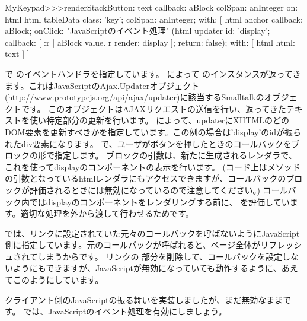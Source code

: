 \documentclass[a4paper,10pt,twoside]{book}
\begin{document}
\begin{code}{}
MyKeypad>>>renderStackButton: text callback: aBlock colSpan: anInteger on: html 
	html tableData
		class: 'key';
		colSpan: anInteger;
		with: [
			html anchor
				callback: aBlock;
				onClick:				"JavaScriptのイベント処理"
					(html updater
						id: 'display';
						callback: [ :r |
							aBlock value.
							r render: display ];
						return: false);
				with: [ html html: text ] ]
\end{code}

で のイベントハンドラを指定しています。
 によって のインスタンスが返ってきます。これはJavaScriptのAjax.Updaterオブジェクト(\url{http://www.prototypejs.org/api/ajax/updater})に該当するSmalltalkのオブジェクトです。
このオブジェクトはAJAXリクエストの送信を行い、返ってきたテキストを使い特定部分の更新を行います。
 によって、updaterにXHTMLのどのDOM要素を更新すべきかを指定しています。この例の場合は'display'のidが振られたdiv要素になります。
 で、ユーザがボタンを押したときのコールバックをブロックの形で指定します。
ブロックの引数は、新たに生成されるレンダラで、これを使ってdisplayのコンポーネントの表示を行います。
(コード上はメソッドの引数となっているhtmlレンダラにもアクセスできますが、コールバックのブロックが評価されるときには無効になっているので注意してください。)
コールバック内ではdisplayのコンポーネントをレンダリングする前に、 を評価しています。適切な処理を外から渡して行わせるためです。

 では、リンクに設定されていた元々のコールバックを呼ばないようにJavaScript側に指定しています。元のコールバックが呼ばれると、ページ全体がリフレッシュされてしまうからです。
リンクの 部分を削除して、コールバックを設定しないようにもできますが、JavaScriptが無効になっていても動作するように、あえてこのようにしています。


クライアント側のJavaScriptの振る舞いを実装しましたが、まだ無効なままです。
では、JavaScriptのイベント処理を有効にしましょう。


\end{document}
